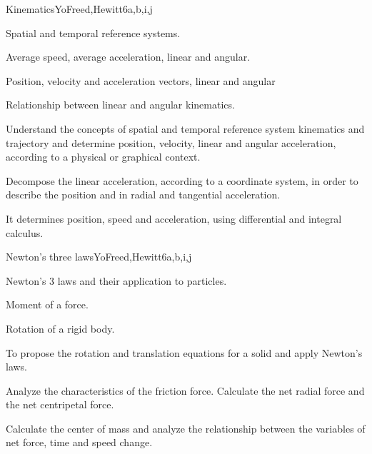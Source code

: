 \begin{syllabus}
\begin{unit}{Kinematics}{}{YoFreed,Hewitt}{6}{a,b,i,j}
   \begin{topics}
      \item Spatial and temporal reference systems.
      \item Average speed, average acceleration, linear and angular.
      \item Position, velocity and acceleration vectors, linear and angular
      \item Relationship between linear and angular kinematics.
      \end{topics}
   \begin{learningoutcomes}
      \item Understand the concepts of spatial and temporal reference system kinematics and trajectory and determine position, velocity, linear and angular acceleration, according to a physical or graphical context.
      \item Decompose the linear acceleration, according to a coordinate system, in order to describe the position and in radial and tangential acceleration.
      \item It determines position, speed and acceleration, using differential and integral calculus. 
   \end{learningoutcomes}
\end{unit}
   
\begin{unit}{Newton's three laws}{}{YoFreed,Hewitt}{6}{a,b,i,j}
   \begin{topics}
      \item Newton's 3 laws and their application to particles.
      \item Moment of a force.
      \item Rotation of a rigid body.
   \end{topics}

   \begin{learningoutcomes}
      \item To propose the rotation and translation equations for a solid and apply Newton's laws. 
      \item Analyze the characteristics of the friction force. Calculate the net radial force and the net centripetal force.
      \item Calculate the center of mass and analyze the relationship between the variables of net force, time and speed change. 
   \end{learningoutcomes}
\end{unit}

\begin{coursebibliography}
\end{coursebibliography}

\end{syllabus}
